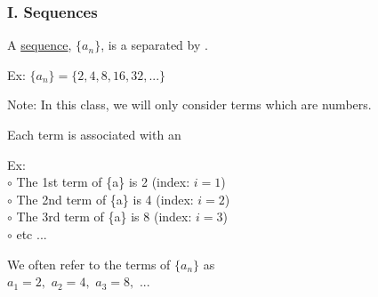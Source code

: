 \begin{frame}
\frametitle{I. Sequences}
\scriptsize
A \underline{sequence}, $\{a_n\}$, is a  separated by . \\

\vspace{0.4cm}

Ex: $\{a_n\} = \{2, 4,  8, 16, 32, ...\}$ \\

\vspace{0.4cm}

Note: In this class, we will only consider terms which are numbers. \\

\vspace{0.4cm}

Each term is associated with an 

\vspace{0.4cm}

Ex: \\

\hspace{1.0cm} $\circ$ The 1st term of \{a\} is 2 \quad (index: $i=1$)\\
\hspace{1.0cm} $\circ$ The 2nd term of \{a\} is 4 \quad (index: $i=2$)\\
\hspace{1.0cm} $\circ$ The 3rd term of \{a\} is 8 \quad (index: $i=3$)\\
\hspace{1.0cm} $\circ$ etc ...

\vspace{0.4cm}

We often refer to the terms of $\{a_n\}$ as \\
\vspace{0.2cm}
$\displaystyle{a_1 = 2, \,\,a_2 = 4, \,\,a_3 = 8, \,\,...}$

\vspace{0.4cm}

\end{frame}

